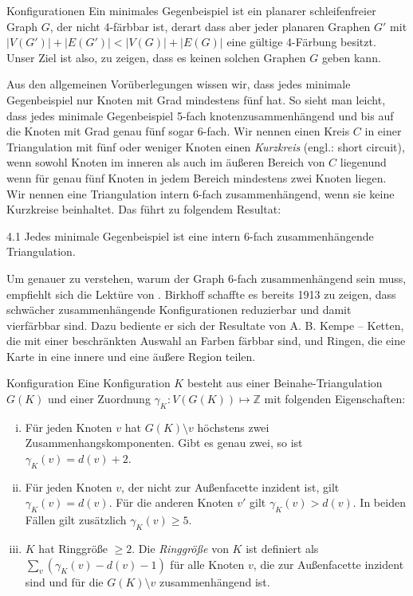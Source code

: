 \begin{section}{Konfigurationen}
 Ein minimales Gegenbeispiel ist ein planarer schleifenfreier Graph $G$, der nicht 4-färbbar ist, derart dass aber jeder planaren Graphen $G'$ mit $|V(G')| + |E(G')| < |V(G)| + |E(G)|$ eine gültige 4-Färbung besitzt. Unser Ziel ist also, zu zeigen, dass es keinen solchen Graphen $G$ geben kann. 
   
 Aus den allgemeinen Vorüberlegungen wissen wir, dass jedes minimale Gegenbeispiel nur Knoten mit Grad mindestens fünf hat. So sieht man leicht, dass jedes minimale Gegenbeispiel 5-fach knotenzusammenhängend und bis auf die Knoten mit Grad genau fünf sogar 6-fach. Wir nennen einen Kreis $C$ in einer Triangulation mit fünf oder weniger Knoten einen \textit{Kurzkreis} (engl.: short circuit), wenn sowohl Knoten im inneren als auch im äußeren Bereich von $C$ liegenund wenn für genau fünf Knoten in jedem Bereich mindestens zwei Knoten liegen. Wir nennen eine Triangulation intern 6-fach zusammenhängend, wenn sie keine Kurzkreise beinhaltet. Das führt zu folgendem Resultat:
  
 \begin{satzl}{}{4.1}
  Jedes minimale Gegenbeispiel ist eine intern 6-fach zusammenhängende Triangulation. 
 \end{satzl}

 Um genauer zu verstehen, warum der Graph 6-fach zusammenhängend sein muss, empfiehlt sich die Lektüre von \cite{AmJMath35}. Birkhoff schaffte es bereits 1913 zu zeigen, dass schwächer zusammenhängende Konfigurationen reduzierbar und damit vierfärbbar sind. Dazu bediente er sich der Resultate von A. B. Kempe -- Ketten, die mit einer beschränkten Auswahl an Farben färbbar sind, und Ringen, die eine Karte in eine innere und eine äußere Region teilen. 
  
 \begin{definition}{Konfiguration}
  Eine Konfiguration $K$ besteht aus einer Beinahe-Triangulation $G(K)$ und einer Zuordnung $\gamma_K : V(G(K)) \mapsto \mathbb{Z}$ mit folgenden Eigenschaften:
  \begin{enumerate}[i)]
   \item Für jeden Knoten $v$ hat $G(K) \setminus v$ höchstens zwei Zusammenhangskomponenten. Gibt es genau zwei, so ist $\gamma_K(v) = d(v) + 2$.
   \item Für jeden Knoten $v$, der nicht zur Außenfacette inzident ist, gilt $\gamma_K(v) = d(v)$. Für die anderen Knoten $v'$ gilt $\gamma_K(v) > d(v)$. In beiden Fällen gilt zusätzlich $\gamma_K(v) \geq 5$.
   \item $K$ hat Ringgröße $\geq 2$. Die \textit{Ringgröße} von $K$ ist definiert als $\sum_v (\gamma_K(v) - d(v) - 1)$ für alle Knoten $v$, die zur Außenfacette inzident sind und für die $G(K) \setminus v$ zusammenhängend ist.
  \end{enumerate}
 \end{definition}
   

\end{section}

